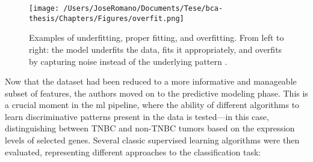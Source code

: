 \begin{figure} [h]
  \centering
  \texttt{[image: /Users/JoseRomano/Documents/Tese/bca-thesis/Chapters/Figures/overfit.png]}
  \caption{Examples of underfitting, proper fitting, and overfitting.
    From left to right: the model underfits the data, fits it appropriately, and overfits by capturing noise instead of the underlying pattern \cite{overfiting_ailab_mti_image}.}
  \label{fig:overfitting}
\end{figure}

Now that the dataset had been reduced to a more informative and manageable
subset of features, the authors moved on to the predictive modeling phase. This
is a crucial moment in the \gls{ml} pipeline, where the ability of different
algorithms to learn discriminative patterns present in the data is tested—in
this case, distinguishing between TNBC and non-TNBC tumors based on the
expression levels of selected genes. Several classic supervised learning
algorithms were then evaluated, representing different approaches to the
classification task:

